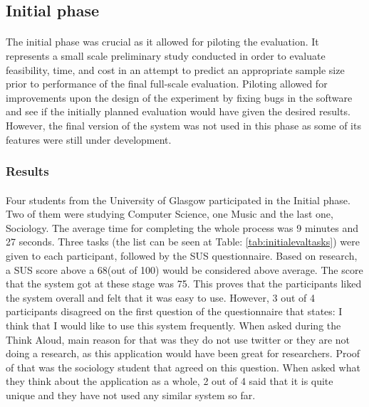 \documentclass{l4proj}
\begin{document}
{\subsection{Initial phase}
\paragraph{}
The initial phase was crucial as it allowed for piloting the evaluation. It represents a small scale preliminary study conducted in order to evaluate feasibility, time, and cost in an attempt to predict an appropriate sample size prior to performance of the final full-scale evaluation\cite{clinicalresearch}. Piloting allowed for improvements upon the design of the experiment by fixing bugs in the software and see if the initially planned evaluation would have given the desired results. However, the final version of the system was not used in this phase as some of its features were still under development. 
\subsubsection{Results}
\paragraph{}
Four students from the University of Glasgow participated in the Initial phase. Two of them were studying Computer Science, one Music and the last one, Sociology. The average time for completing the whole process was 9 minutes and 27 seconds. Three tasks (the list can be seen at Table: \ref{tab:initialevaltasks}) were given to each participant, followed by the SUS questionnaire. Based on research, a SUS score above a 68(out of 100) would be considered above average. The score that the system got at these stage was 75. This proves that the participants liked the system overall and felt that it was easy to use. However, 3 out of 4 participants disagreed on the first question of the questionnaire that states: I think that I would like to use this system frequently. When asked during the Think Aloud, main reason for that was they do not use twitter or they are not doing a research, as this application would have been great for researchers. Proof of that was the sociology student that agreed on this question. When asked what they think about the application as a whole, 2 out of 4 said that it is quite unique and they have not used any similar system so far.
}
\end{document}
